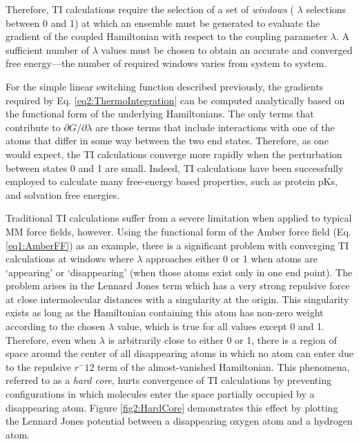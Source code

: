 Therefore, TI calculations require the selection of a set of \emph{windows} (\ie
$\lambda$ selections between 0 and 1) at which an ensemble must be generated to
evaluate the gradient of the coupled Hamiltonian with respect to the coupling
parameter $\lambda$. A sufficient number of $\lambda$ values must be chosen to
obtain an accurate and converged free energy---the number of required windows
varies from system to system.

For the simple linear switching function described previously, the gradients
required by Eq. \ref{eq2:ThermoIntegration} can be computed analytically based
on the functional form of the underlying Hamiltonians. The only terms that
contribute to $\partial G / \partial \lambda$ are those terms that include
interactions with one of the atoms that differ in some way between the two end
states. Therefore, as one would expect, the TI calculations converge more
rapidly when the perturbation between states 0 and 1 are small. Indeed, TI
calculations have been successfully employed to calculate many free-energy based
properties, such as protein pKs, \cite{Davies_JAmChemSoc_2002_v124_p6594}
and solvation free energies. \cite{Steinbrecher2011}

Traditional TI calculations suffer from a severe limitation when applied to
typical MM force fields, however. Using the functional form of the Amber force
field (Eq. \ref{eq1:AmberFF}) as an example, there is a significant problem with
converging TI calculations at windows where $\lambda$ approaches either 0 or 1
when atoms are `appearing' or `disappearing' (\ie when those atoms exist only in
one end point). The problem arises in the Lennard Jones term which has a very
strong repulsive force at close intermolecular distances with a singularity at
the origin. This singularity exists as long as the Hamiltonian containing this
atom has non-zero weight according to the chosen $\lambda$ value, which is true
for all values except 0 and 1. Therefore, even when $\lambda$ is arbitrarily
close to either 0 or 1, there is a region of space around the center of all
disappearing atoms in which no atom can enter due to the repulsive $r^-{12}$
term of the almost-vanished Hamiltonian. This phenomena, referred to as a
\emph{hard core}, hurts convergence of TI calculations by preventing
configurations in which molecules enter the space partially occupied by a
disappearing atom. \cite{Beutler_ChemPhysLett_1994_v222_p529} Figure
\ref{fig2:HardCore} demonstrates this effect by plotting the Lennard Jones
potential between a disappearing oxygen atom and a hydrogen atom.

